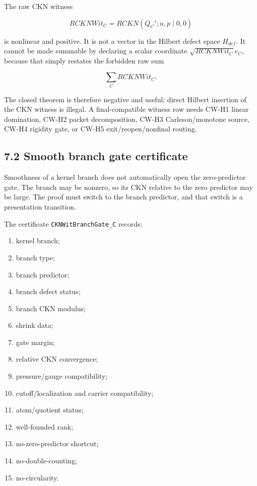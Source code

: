 \documentclass[11pt]{article}
\begin{document}
The raw CKN witness

\[RCKNWit_C=RCKN(Q_C';u,p\mid 0,0)\]

is nonlinear and positive. It is not a vector in the Hilbert defect space \(H_{def}\). It cannot be made summable by declaring a scalar coordinate \(\sqrt{RCKNWit_C}e_C\), because that simply restates the forbidden raw sum

\[\sum_C RCKNWit_C.\]

The closed theorem is therefore negative and useful: direct Hilbert insertion of the CKN witness is illegal. A final-compatible witness row needs CW-H1 linear domination, CW-H2 packet decomposition, CW-H3 Carleson/monotone source, CW-H4 rigidity gate, or CW-H5 exit/reopen/nonfinal routing.

\subsection*{7.2 Smooth branch gate certificate}

Smoothness of a kernel branch does not automatically open the zero-predictor gate. The branch may be nonzero, so its CKN relative to the zero predictor may be large. The proof must switch to the branch predictor, and that switch is a presentation transition.

The certificate \texttt{CKNWitBranchGate\_C} records:

\begin{enumerate}
\item
  kernel branch;
\item
  branch type;
\item
  branch predictor;
\item
  branch defect status;
\item
  branch CKN modulus;
\item
  shrink data;
\item
  gate margin;
\item
  relative CKN convergence;
\item
  pressure/gauge compatibility;
\item
  cutoff/localization and carrier compatibility;
\item
  atom/quotient status;
\item
  well-founded rank;
\item
  no-zero-predictor shortcut;
\item
  no-double-counting;
\item
  no-circularity.
\end{enumerate}
\end{document}
